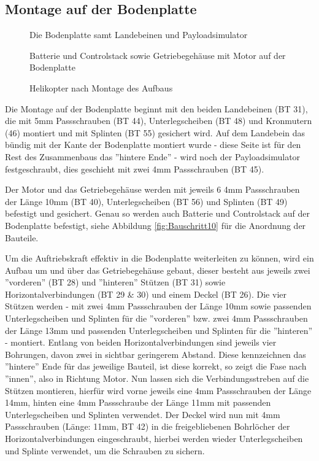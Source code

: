 \documentclass[10pt, a4paper]{article}
\newcommand{\CaptSpac}{-10pt}
\begin{document}
\subsection{Montage auf der Bodenplatte}
\begin{wrapfigure}{r}{0.31\textwidth}
  \vspace{-10pt}
  \vspace{\CaptSpac}
  \caption{\label{fig:Bauschritt8}Die Bodenplatte samt Landebeinen und Payloadsimulator}
  \vspace{\CaptSpac}
  \caption{\label{fig:Bauschritt10}Batterie und Controlstack sowie Getriebegehäuse mit Motor auf der Bodenplatte} 
  \vspace{\CaptSpac}
  \caption{\label{fig:Bauschritt11}Helikopter nach Montage des Aufbaus}
  \vspace{-10pt}
\end{wrapfigure}
Die Montage auf der Bodenplatte beginnt mit den beiden Landebeinen (BT 31), die mit 5mm Passschrauben (BT 44), Unterlegscheiben (BT 48)  und Kronmutern (46) montiert und mit Splinten (BT 55) gesichert wird. Auf dem Landebein das bündig mit der Kante der Bodenplatte montiert wurde - diese Seite ist für den Rest des Zusammenbaus das ''hintere Ende'' - wird noch der Payloadsimulator festgeschraubt, dies geschieht mit zwei 4mm Passschrauben (BT 45).

Der Motor und das Getriebegehäuse werden mit jeweils 6 4mm Passschrauben der Länge 10mm (BT 40), Unterlegscheiben (BT 56) und Splinten (BT 49) befestigt und gesichert. Genau so werden auch Batterie und Controlstack auf der Bodenplatte befestigt, siehe Abbildung \ref{fig:Bauschritt10} für die Anordnung der Bauteile. 

Um die Auftriebskraft effektiv in die Bodenplatte weiterleiten zu können, wird ein Aufbau um und über das Getriebegehäuse gebaut, dieser besteht aus jeweils zwei ''vorderen'' (BT 28) und ''hinteren'' Stützen (BT 31) sowie Horizontalverbindungen (BT 29 \& 30) und einem Deckel (BT 26). Die vier Stützen werden - mit zwei 4mm Passschrauben der Länge 10mm sowie passenden Unterlegscheiben und Splinten für die ''vorderen'' bzw. zwei 4mm Passschrauben der Länge 13mm und passenden Unterlegscheiben und Splinten für die ''hinteren'' - montiert. Entlang von beiden Horizontalverbindungen sind jeweils vier Bohrungen, davon zwei in sichtbar geringerem Abstand. Diese kennzeichnen das ''hintere'' Ende für das jeweilige Bauteil, ist diese korrekt, so zeigt die Fase nach ''innen'', also in Richtung Motor. Nun lassen sich die Verbindungsstreben auf die Stützen montieren, hierfür wird vorne jeweils eine 4mm Passschrauben der Länge 14mm, hinten eine 4mm Passschraube der Länge 11mm mit passenden Unterlegscheiben und Splinten verwendet. 
Der Deckel wird nun mit 4mm Passschrauben (Länge: 11mm, BT 42) in die freigebliebenen Bohrlöcher der Horizontalverbindungen eingeschraubt, hierbei werden wieder Unterlegscheiben und Splinte verwendet, um die Schrauben zu sichern. 
\end{document}
